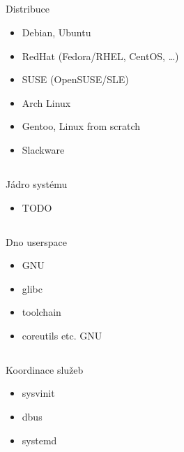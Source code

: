 \documentclass{beamer}
\begin{document}
\subsection{}
\begin{frame}{Distribuce}
\begin{itemize}
\item Debian, Ubuntu
\item RedHat (Fedora/RHEL, CentOS, \dots)
\item SUSE (OpenSUSE/SLE)
\item Arch Linux
\item Gentoo, Linux from scratch
\item Slackware
\end{itemize}
\end{frame}

\subsection{}
\begin{frame}{Jádro systému}
\begin{itemize}
\item TODO
\end{itemize}
\end{frame}

\subsection{}
\begin{frame}{Dno userspace}
\begin{itemize}
\item GNU
\item glibc
\item toolchain
\item coreutils etc. GNU
\end{itemize}
\end{frame}

\subsection{}
\begin{frame}{Koordinace služeb}
\begin{itemize}
\item sysvinit
\item dbus
\item systemd
\end{itemize}
\end{frame}
\end{document}
